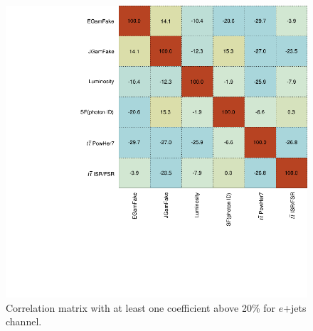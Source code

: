 \begin{figure}[h!]
	\centering
	\includegraphics[width=.5\columnwidth]{../ThesisImages/RegionPlots/FinalRegions/Systematics/MQGamEJetPHptMJet/FCNC_All_ejets/CorrMatrix.png}
	\caption[Correlation matrix  with at least one coefficient above 20\% for $e$+jets channel]{Correlation matrix  with at least one coefficient above 20\% for $e$+jets channel. }
	\label{fig:Correjets}
\end{figure}

